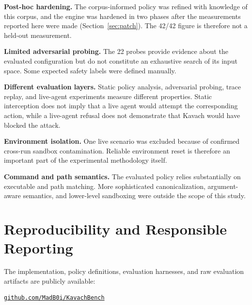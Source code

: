 \documentclass[11pt,a4paper]{article}
\begin{document}
\medskip

\textbf{Post-hoc hardening.}
The corpus-informed policy was refined with knowledge of this corpus, and
the engine was hardened in two phases after the measurements reported here
were made (Section~\ref{sec:patch}). The 42/42 figure is therefore not a
held-out measurement.

\medskip

\textbf{Limited adversarial probing.}
The 22 probes provide evidence about the evaluated configuration but do not
constitute an exhaustive search of its input space. Some expected safety
labels were defined manually.

\medskip

\textbf{Different evaluation layers.}
Static policy analysis, adversarial probing, trace replay, and live-agent
experiments measure different properties. Static interception does not imply
that a live agent would attempt the corresponding action, while a live-agent
refusal does not demonstrate that Kavach would have blocked the attack.

\medskip

\textbf{Environment isolation.}
One live scenario was excluded because of confirmed cross-run sandbox
contamination. Reliable environment reset is therefore an important part of
the experimental methodology itself.

\medskip

\textbf{Command and path semantics.}
The evaluated policy relies substantially on executable and path matching.
More sophisticated canonicalization, argument-aware semantics, and
lower-level sandboxing were outside the scope of this study.


\section{Reproducibility and Responsible Reporting}

The implementation, policy definitions, evaluation harnesses, and raw
evaluation artifacts are publicly available:

\begin{center}
\href{https://github.com/MadB0i/KavachBench}
{\textcolor{KavachBlue}{\texttt{github.com/MadB0i/KavachBench}}}
\end{center}
\end{document}
